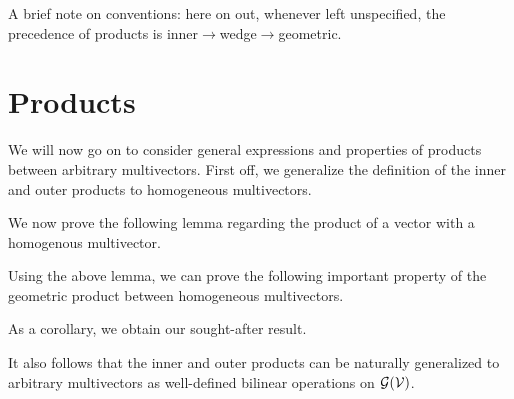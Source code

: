 % 
% 

A brief note on conventions: here on out, whenever left unspecified, the precedence of products is inner$\to$wedge$\to$geometric.

%
%



\section{Products}\label{s:products}
We will now go on to consider general expressions and properties of products between arbitrary multivectors.
First off, we generalize the definition of the inner and outer products to homogeneous multivectors.



We now prove the following lemma regarding the product of a vector with a homogenous multivector.



Using the above lemma, we can prove the following important property of the geometric product between homogeneous multivectors.



As a corollary, we obtain our sought-after result.


It also follows that the inner and outer products can be naturally generalized to arbitrary multivectors as well-defined bilinear operations on $\mathcal{G}(\mathcal{V})$.



